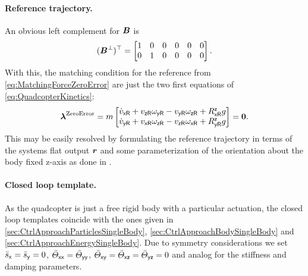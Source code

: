 \paragraph{Reference trajectory.}
An obvious left complement for $\boldsymbol{B}$ is
\begin{align}
 (\boldsymbol{B}^\bot)^\top = \begin{bmatrix} 1 & 0 & 0 & 0 & 0 & 0 \\ 0 & 1 & 0 & 0 & 0 & 0 \end{bmatrix}.
\end{align}
With this, the matching condition for the reference from \eqref{eq:MatchingForceZeroError} are just the two first equations of \eqref{eq:QuadcopterKinetics}:
\begin{align}
 \boldsymbol{\lambda}^{\text{ZeroError}} = m \begin{bmatrix} \dot{v}_{\mathsf{x}\mathsf{R}} + v_{\mathsf{z}\mathsf{R}}\omega_{\mathsf{y}\mathsf{R}}-v_{\mathsf{y}\mathsf{R}}\omega_{\mathsf{z}\mathsf{R}} + R^{\mathsf{z}}_{\mathsf{x}\mathsf{R}}g \\ \dot{v}_{\mathsf{y}\mathsf{R}} + v_{\mathsf{x}\mathsf{R}}\omega_{\mathsf{z}\mathsf{R}}-v_{\mathsf{z}\mathsf{R}}\omega_{\mathsf{x}\mathsf{R}} + R^{\mathsf{z}}_{\mathsf{y}\mathsf{R}} g \end{bmatrix} = \boldsymbol{0}
 .
\end{align}
This may be easily resolved by formulating the reference trajectory in terms of the systems flat output $\boldsymbol{r}$ and some parameterization of the orientation about the body fixed z-axis as done in \cite{Konz:QuadrotorMovingFrame}.

\paragraph{Closed loop template.}
As the quadcopter is just a free rigid body with a particular actuation, the closed loop templates coincide with the ones given in \autoref{sec:CtrlApproachParticlesSingleBody}, \autoref{sec:CtrlApproachBodySingleBody} and \autoref{sec:CtrlApproachEnergySingleBody}.
Due to symmetry considerations we set $\bar{s}_{\mathsf{x}} = \bar{s}_{\mathsf{y}} = 0$, $\bar{\varTheta}_{\mathsf{x}\mathsf{x}}=\bar{\varTheta}_{\mathsf{y}\mathsf{y}}$, $\bar{\varTheta}_{\mathsf{x}\mathsf{y}}=\bar{\varTheta}_{\mathsf{x}\mathsf{z}}=\bar{\varTheta}_{\mathsf{y}\mathsf{z}}=0$ and analog for the stiffness and damping parameters.

